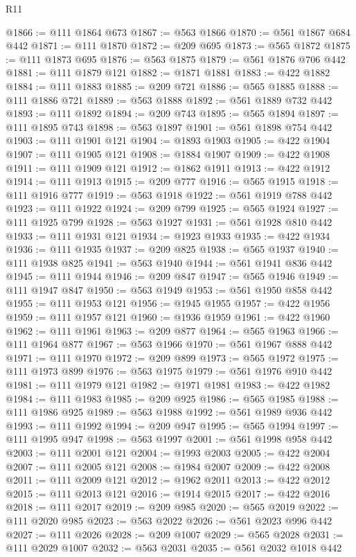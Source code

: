 \begin{lexlean}{R11}
\begin{coremodule}
{{{{{{{{{{{{{{{{{{{{{{{{{{{{{{{{{{{{{{{{{{{{{{{{{{{{{{{{{{{{{{{{{{{{{{{{{{{{{{{{{{@1866 := @111 @1864 @673
@1867 := @563 @1866
@1870 := @561 @1867 @684 @442
@1871 := @111 @1870
@1872 := @209 @695
@1873 := @565 @1872
@1875 := @111 @1873 @695
@1876 := @563 @1875
@1879 := @561 @1876 @706 @442
@1881 := @111 @1879 @121
@1882 := @1871 @1881
@1883 := @422 @1882
@1884 := @111 @1883
@1885 := @209 @721
@1886 := @565 @1885
@1888 := @111 @1886 @721
@1889 := @563 @1888
@1892 := @561 @1889 @732 @442
@1893 := @111 @1892
@1894 := @209 @743
@1895 := @565 @1894
@1897 := @111 @1895 @743
@1898 := @563 @1897
@1901 := @561 @1898 @754 @442
@1903 := @111 @1901 @121
@1904 := @1893 @1903
@1905 := @422 @1904
@1907 := @111 @1905 @121
@1908 := @1884 @1907
@1909 := @422 @1908
@1911 := @111 @1909 @121
@1912 := @1862 @1911
@1913 := @422 @1912
@1914 := @111 @1913
@1915 := @209 @777
@1916 := @565 @1915
@1918 := @111 @1916 @777
@1919 := @563 @1918
@1922 := @561 @1919 @788 @442
@1923 := @111 @1922
@1924 := @209 @799
@1925 := @565 @1924
@1927 := @111 @1925 @799
@1928 := @563 @1927
@1931 := @561 @1928 @810 @442
@1933 := @111 @1931 @121
@1934 := @1923 @1933
@1935 := @422 @1934
@1936 := @111 @1935
@1937 := @209 @825
@1938 := @565 @1937
@1940 := @111 @1938 @825
@1941 := @563 @1940
@1944 := @561 @1941 @836 @442
@1945 := @111 @1944
@1946 := @209 @847
@1947 := @565 @1946
@1949 := @111 @1947 @847
@1950 := @563 @1949
@1953 := @561 @1950 @858 @442
@1955 := @111 @1953 @121
@1956 := @1945 @1955
@1957 := @422 @1956
@1959 := @111 @1957 @121
@1960 := @1936 @1959
@1961 := @422 @1960
@1962 := @111 @1961
@1963 := @209 @877
@1964 := @565 @1963
@1966 := @111 @1964 @877
@1967 := @563 @1966
@1970 := @561 @1967 @888 @442
@1971 := @111 @1970
@1972 := @209 @899
@1973 := @565 @1972
@1975 := @111 @1973 @899
@1976 := @563 @1975
@1979 := @561 @1976 @910 @442
@1981 := @111 @1979 @121
@1982 := @1971 @1981
@1983 := @422 @1982
@1984 := @111 @1983
@1985 := @209 @925
@1986 := @565 @1985
@1988 := @111 @1986 @925
@1989 := @563 @1988
@1992 := @561 @1989 @936 @442
@1993 := @111 @1992
@1994 := @209 @947
@1995 := @565 @1994
@1997 := @111 @1995 @947
@1998 := @563 @1997
@2001 := @561 @1998 @958 @442
@2003 := @111 @2001 @121
@2004 := @1993 @2003
@2005 := @422 @2004
@2007 := @111 @2005 @121
@2008 := @1984 @2007
@2009 := @422 @2008
@2011 := @111 @2009 @121
@2012 := @1962 @2011
@2013 := @422 @2012
@2015 := @111 @2013 @121
@2016 := @1914 @2015
@2017 := @422 @2016
@2018 := @111 @2017
@2019 := @209 @985
@2020 := @565 @2019
@2022 := @111 @2020 @985
@2023 := @563 @2022
@2026 := @561 @2023 @996 @442
@2027 := @111 @2026
@2028 := @209 @1007
@2029 := @565 @2028
@2031 := @111 @2029 @1007
@2032 := @563 @2031
@2035 := @561 @2032 @1018 @442
}}}}}}}}}}}}}}}}}}}}}}}}}}}}}}}}}}}}}}}}}}}}}}}}}}}}}}}}}}}}}}}}}}}}}}}}}}}}}}}}}}
\end{coremodule}
\end{lexlean}
